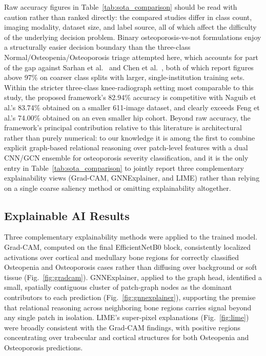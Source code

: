 \documentclass[conference]{IEEEtran}
\begin{document}
Raw accuracy figures in Table~\ref{tab:sota_comparison} should be read with caution rather than ranked directly: the compared studies differ in class count, imaging modality, dataset size, and label source, all of which affect the difficulty of the underlying decision problem. Binary osteoporosis-vs-not formulations enjoy a structurally easier decision boundary than the three-class Normal/Osteopenia/Osteoporosis triage attempted here, which accounts for part of the gap against Sarhan et al.\ \cite{Sarhan2024} and Chen et al.\ \cite{Chen2024}, both of which report figures above 97\% on coarser class splits with larger, single-institution training sets. Within the stricter three-class knee-radiograph setting most comparable to this study, the proposed framework's 82.94\% accuracy is competitive with Naguib et al.'s \cite{Naguib2024} 83.74\% obtained on a smaller 611-image dataset, and clearly exceeds Feng et al.'s \cite{Feng2024} 74.00\% obtained on an even smaller hip cohort. Beyond raw accuracy, the framework's principal contribution relative to this literature is architectural rather than purely numerical: to our knowledge it is among the first to combine explicit graph-based relational reasoning over patch-level features with a dual CNN/GCN ensemble for osteoporosis severity classification, and it is the only entry in Table~\ref{tab:sota_comparison} to jointly report three complementary explainability views (Grad-CAM, GNNExplainer, and LIME) rather than relying on a single coarse saliency method or omitting explainability altogether.

\subsection{Explainable AI Results}
Three complementary explainability methods were applied to the trained model. Grad-CAM, computed on the final EfficientNetB0 block, consistently localized activations over cortical and medullary bone regions for correctly classified Osteopenia and Osteoporosis cases rather than diffusing over background or soft tissue (Fig.~\ref{fig:gradcam}). GNNExplainer, applied to the graph head, identified a small, spatially contiguous cluster of patch-graph nodes as the dominant contributors to each prediction (Fig.~\ref{fig:gnnexplainer}), supporting the premise that relational reasoning across neighboring bone regions carries signal beyond any single patch in isolation. LIME's super-pixel explanations (Fig.~\ref{fig:lime}) were broadly consistent with the Grad-CAM findings, with positive regions concentrating over trabecular and cortical structures for both Osteopenia and Osteoporosis predictions.
\end{document}
